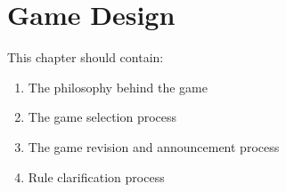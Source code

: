 \chapter{Game Design}

This chapter should contain:
\begin{enumerate}
\item The philosophy behind the game
\item The game selection process
\item The game revision and announcement process
\item Rule clarification process
\end{enumerate}
